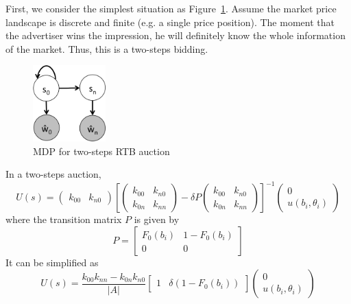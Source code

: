 First, we consider the simplest situation as Figure~\ref{fig:MDPs_2}. Assume the market price landscape is discrete and finite (e.g. a single price position). The moment that the advertiser wins the impression, he will definitely know the whole information of the market. Thus, this is a two-steps bidding.

\begin{figure}[htbp]
\centering
\includegraphics[width=0.25\textwidth]{MDPs_2.png}
\caption{MDP for two-steps RTB auction}
\label{fig:MDPs_2}
\end{figure}
In a two-steps auction, 
\begin{equation}
U(s) = \left( {\begin{array}{*{20}{c}}
{{k_{00}}}&{{k_{n0}}}
\end{array}} \right){\left[ {\left( {\begin{array}{*{20}{c}}
{{k_{00}}}&{{k_{n0}}}\\
{{k_{0n}}}&{{k_{nn}}}
\end{array}} \right) - \delta P\left( {\begin{array}{*{20}{c}}
{{k_{00}}}&{{k_{n0}}}\\
{{k_{0n}}}&{{k_{nn}}}
\end{array}} \right)} \right]^{ - 1}}\left( {\begin{array}{*{20}{c}}
0\\
{u({b_i},{\theta _i})}
\end{array}} \right)
\end{equation}
where the transition matrix $P$ is given by
\begin{equation}
P=\begin{bmatrix}
F_{0}(b_i) & 1-F_{0}(b_i)\\ 
0 & 0 
\end{bmatrix}
\end{equation}
It can be simplified as
\begin{equation}
U(s) = \frac{{{k_{00}}{k_{nn}} - {k_{0n}}{k_{n0}}}}{{\left| A \right|}}\left[ {\begin{array}{*{20}{c}}
1&{\delta (1 - {F_0}({b_i}))}
\end{array}} \right]\left( {\begin{array}{*{20}{c}}
0\\
{u({b_i},{\theta _i})}
\end{array}} \right)
\end{equation}
